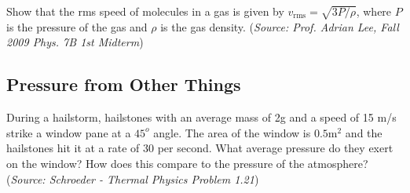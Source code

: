 \documentclass{article}
\begin{document}
Show that the rms speed of molecules in a gas is given by $v_{\mathrm{rms}} = \sqrt{3P/\rho}$, where $P$ is the pressure of the gas and $\rho$ is the gas density. (\textit{Source: Prof. Adrian Lee, Fall 2009 Phys. 7B 1st Midterm})

\subsection{Pressure from Other Things}

During a hailstorm, hailstones with an average mass of 2g and a speed of 15 m/s strike a window pane at a $45^{o}$ angle. The area of the window is $0.5 \mathrm{m}^2$ and the hailstones hit it at a rate of 30 per second. What average pressure do they exert on the window? How does this compare to the pressure of the atmosphere? (\textit{Source: Schroeder - Thermal Physics Problem 1.21})
\end{document}
